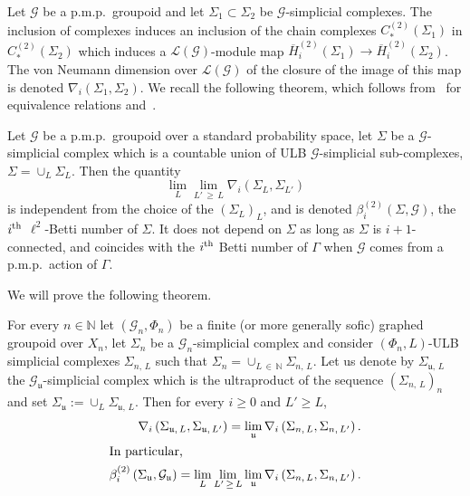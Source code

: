 \documentclass[AHL,Unicode,longabstracts,published]{cedram}
\newcommand{\Nmath}{\mathbb{N}}
\newcommand{\cg}{\mathcal{G}}
\newcommand{\uu}{\mathfrak{u}}
\newcommand{\ul}{\mathfrak{u}}
\newcommand{\pmp}{p.m.p.\ }
\newcommand{\lvN}{\mathcal{L}(\cg)}
\begin{document}
Let $\cg$ be a \pmp groupoid and let $\Sigma_1\subset \Sigma_2$ be $\cg$-simplicial complexes. The inclusion of complexes induces an inclusion of the chain complexes $C_*^{(2)}(\Sigma_1)$ in $C_*^{(2)}(\Sigma_2)$ which induces a $\lvN$-module map $\overline H_i^{(2)}(\Sigma_1) \to \overline H_i^{(2)}(\Sigma_2)$. The von Neumann dimension over $\lvN$ of the closure of the image of this map is denoted $\nabla_i(\Sigma_1,\Sigma_2)$. We recall the following theorem, which follows from~\cite[Proposition~3.9, Théorème~3.13]{gab_ihes} for equivalence relations and~\cite[Proposition~3.7]{Takimoto-cost-L2-2005}.

\begin{theo}[Gaboriau]
Let $\cg$ be a \pmp groupoid over a standard probability space, let $\Sigma$ be a $\cg$-simplicial complex which is a countable union of ULB $\cg$-simplicial sub-complexes, $\Sigma=\cup_L\Sigma_L$. Then the quantity
\begin{equation}\label{eq:formula_for_betti_number}
\lim_{L} \lim_{L'\,\geq\,L} \nabla_i\left(\Sigma_{L},\Sigma_{L'}\right)
\end{equation}
is independent from the choice of the $(\Sigma_L)_L$, and is denoted $\beta^{(2)}_i(\Sigma,\cg)$, the $i^{\rm th}$ $\ell^2$-Betti number of $\Sigma$. It does not depend on $\Sigma$ as long as $\Sigma$ is $i+1$-connected, and coincides with the $i^{\rm th}$ Betti number of $\Gamma$ when $\cg$ comes from a \pmp action of $\Gamma$.
\end{theo}

We will prove the following theorem.

\begin{theo}\label{thm:limitgeneral}
For every $n\in\Nmath$ let $(\cg_n,\Phi_n)$ be a finite (or more generally sofic) graphed groupoid over $X_n$, let $\Sigma_n$ be a $\cg_n$-simplicial complex and consider $(\Phi_n,L)$-ULB simplicial complexes $\Sigma_{n,\,L}$ such that $\Sigma_n=\cup_{L\,\in\,\Nmath} \Sigma_{n,\,L}$. Let us denote by $\Sigma_{\ul,\,L}$ the $\cg_\ul$-simplicial complex which is the ultraproduct of the sequence $(\Sigma_{n,\,L})_n$ and set $\Sigma_\ul:=\cup_L\Sigma_{\ul,\,L}$. Then for every $i \geq 0$ and $L' \geq L$,
\begin{align*}
\nabla_i\left(\Sigma_{\ul,\,L},\Sigma_{\ul,\,L'}\right) = \lim_\uu \nabla_i\left(\Sigma_{n,\,L},\Sigma_{n,\,L'}\right).
\\
\intertext{In particular,}
\beta^{(2)}_i\left(\Sigma_\ul,\cg_\ul\right) = \lim_{L} \lim_{L'\,\geq\,L} \lim_\uu \nabla_i\left(\Sigma_{n,\,L},\Sigma_{n,\,L'}\right).
\end{align*}
\end{theo}
\end{document}
